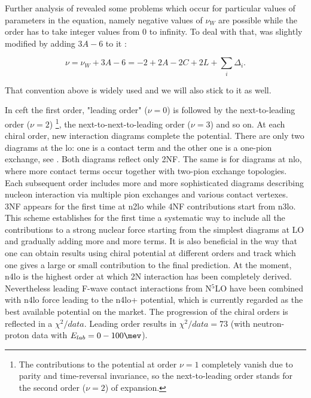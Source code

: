 Further analysis of  revealed some problems which occur 
for particular values of parameters in the equation, namely negative values of $\nu_W$ 
are possible while the order has to take integer values from 0 to infinity.
To deal with that,  
was slightly modified by adding $3A - 6$ to it  \cite{Machleidt2011, EPELBAUM2006_PROGRESS}:

\begin{equation}
    \nu = \nu_W + 3A  - 6 = -2 + 2A - 2C + 2L + \sum_i \Delta_i.
    \label{powers_corrected}
\end{equation}

That convention above is widely used and we will also stick to it as well.

In \gls{ceft} the first order, "leading order" ($\nu=0$) is followed 
by the next-to-leading order ($\nu=2$)
\footnote{The contributions to the potential at order $\nu=1$ completely vanish due to parity and time-reversal invariance,
so the next-to-leading order stands for the second order ($\nu=2$) of expansion.},
 the next-to-next-to-leading order ($\nu=3$) and so on.
 At each chiral order, new interaction diagrams complete the potential.
 There are only two diagrams at the \gls{lo}: one is a contact term
 and the other one
 is a one-pion exchange, see . Both diagrams reflect only 2NF.
 The same is for diagrams at \gls{nlo}, where more contact terms occur together with two-pion 
 exchange topologies. Each subsequent order includes more and more sophisticated diagrams
 describing nucleon interaction
 via multiple pion exchanges and various contact vertexes.
 3NF appears for the first time at \gls{n2lo}
 while 4NF contributions start from \gls{n3lo}.
 This scheme establishes for the first time a systematic
way to include all the contributions to a strong nuclear force
 starting from the simplest diagrams at LO and gradually
adding more and more terms. 
It is also beneficial in the way that 
one can obtain results using chiral potential at different
orders and track which one gives a large or small contribution to the final prediction.
At the moment, \gls{n4lo} is the highest order at which 2N interaction has been completely derived.
Nevertheless leading F-wave contact interactions from N$^5$LO have been combined with \gls{n4lo} force
leading to the \gls{n4lo+} potential,
which is currently regarded as the best available potential on the market.
The progression of the chiral orders is reflected in a $\chi^2/data$.
Leading order results in $\chi^2/data = 73$ (with neutron-proton data with $E_{lab} = 0-100 \unit{\mev}$).
